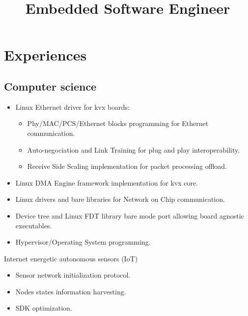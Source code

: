 \documentclass[11pt,a4paper,sans]{moderncv}        %
\title{Embedded Software Engineer}                               %
\begin{document}
\vspace*{-1cm}
\makecvtitle

\vspace*{-1.5cm}
\setlength{\hintscolumnwidth}{0.15\textwidth} %

\section{Experiences}
\subsection{Computer science}
	{
	\begin{itemize}
		\item Linux Ethernet driver for kvx boards:
		\begin{itemize}
			\item Phy/MAC/PCS/Ethernet blocks programming for
				Ethernet communication.
			\item Auto-negociation and Link Training for plug and
				play interoperability.
			\item Receive Side Scaling implementation for packet
				processing offload.
		\end{itemize}
		\item Linux DMA Engine framework implementation for kvx core.
		\item Linux drivers and bare libraries for Network on Chip
			communication.
		\item Device tree and Linux FDT library bare mode port allowing
			board agnostic executables.
		\item Hypervisor/Operating System programming.
	\end{itemize}
	}
	{Internet energetic autonomous sensors (IoT)
	\begin{itemize}
		\item Sensor network initialization protocol.
		\item Nodes states information harvesting.
		\item SDK optimization.
	\end{itemize}
	}
\end{document}

